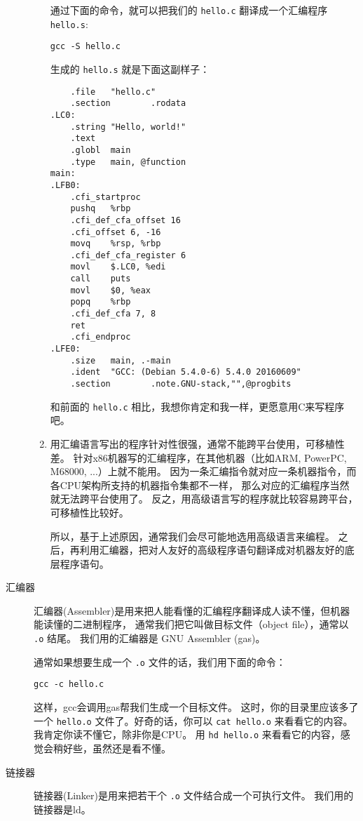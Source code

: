 \documentclass{wx672article}
\begin{document}
\begin{description}
\begin{enumerate}
通过下面的命令，就可以把我们的 \texttt{hello.c} 翻译成一个汇编程序 \texttt{hello.s}:
\begin{verbatim}
gcc -S hello.c
\end{verbatim}
生成的 \texttt{hello.s} 就是下面这副样子：

\begin{verbatim}
	.file   "hello.c"
	.section        .rodata
.LC0:
	.string "Hello, world!"
	.text
	.globl  main
	.type   main, @function
main:
.LFB0:
	.cfi_startproc
	pushq   %rbp
	.cfi_def_cfa_offset 16
	.cfi_offset 6, -16
	movq    %rsp, %rbp
	.cfi_def_cfa_register 6
	movl    $.LC0, %edi
	call    puts
	movl    $0, %eax
	popq    %rbp
	.cfi_def_cfa 7, 8
	ret
	.cfi_endproc
.LFE0:
	.size   main, .-main
	.ident  "GCC: (Debian 5.4.0-6) 5.4.0 20160609"
	.section        .note.GNU-stack,"",@progbits
\end{verbatim}

和前面的 \texttt{hello.c} 相比，我想你肯定和我一样，更愿意用C来写程序吧。

\item 用汇编语言写出的程序针对性很强，通常不能跨平台使用，可移植性差。
针对x86机器写的汇编程序，在其他机器（比如ARM, PowerPC, M68000, ...）上就不能用。
因为一条汇编指令就对应一条机器指令，而各CPU架构所支持的机器指令集都不一样，
那么对应的汇编程序当然就无法跨平台使用了。        
反之，用高级语言写的程序就比较容易跨平台，可移植性比较好。

所以，基于上述原因，通常我们会尽可能地选用高级语言来编程。
之后，再利用汇编器，把对人友好的高级程序语句翻译成对机器友好的底层程序语句。
\end{enumerate}

\item[{汇编器}] 汇编器(Assembler)是用来把人能看懂的汇编程序翻译成人读不懂，但机器能读懂的二进制程序，
通常我们把它叫做目标文件（object file），通常以 \texttt{.o} 结尾。 
我们用的汇编器是 GNU Assembler (gas)。

通常如果想要生成一个 \texttt{.o} 文件的话，我们用下面的命令：               
\begin{verbatim}
gcc -c hello.c
\end{verbatim}
这样，gcc会调用gas帮我们生成一个目标文件。
这时，你的目录里应该多了一个 \texttt{hello.o} 文件了。好奇的话，你可以
\texttt{cat hello.o} 来看看它的内容。我肯定你读不懂它，除非你是CPU。
用 \texttt{hd hello.o} 来看看它的内容，感觉会稍好些，虽然还是看不懂。

\item[{链接器}] 链接器(Linker)是用来把若干个 \texttt{.o} 文件结合成一个可执行文件。
我们用的链接器是ld。


\end{description}
\end{document}
